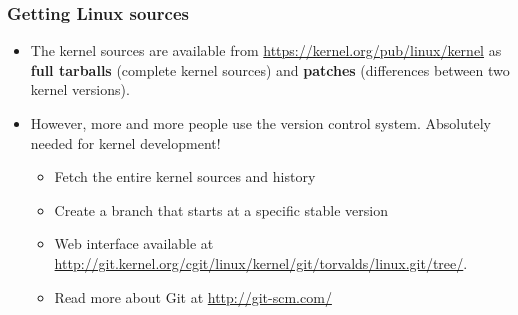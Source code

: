 \begin{frame}
  \frametitle{Getting Linux sources}
  \begin{itemize}
  \item The kernel sources are available from
    \url{https://kernel.org/pub/linux/kernel} as {\bf full tarballs}
    (complete kernel sources) and {\bf patches} (differences between
    two kernel versions).
  \item However, more and more people use the  version
    control system. Absolutely needed for kernel development!
    \begin{itemize}
    \item Fetch the entire kernel sources and history\\
    \item Create a branch that starts at a specific stable version\\
    \item Web interface available at
      \url{http://git.kernel.org/cgit/linux/kernel/git/torvalds/linux.git/tree/}.
    \item Read more about Git at \url{http://git-scm.com/}
    \end{itemize}
  \end{itemize}
\end{frame}

